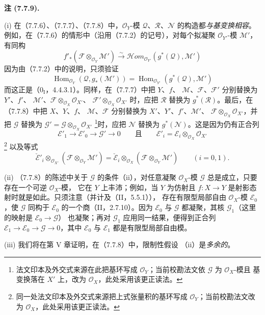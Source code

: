 \documentclass[UTF8,fontset=none,11pt,oneside,openany]{ctexbook}
\newcommand{\SourceCorrectionNote}[1]{\footnote{#1}}
\newenvironment{remarks}[1][]{%
  \par\medskip\noindent\textbf{注 (#1).}\ %
}{\par}
\newcommand{\oldpage}[2][]{%
  \hypertarget{ega-source-page-#1-#2}{}%
  \marginnote{\scriptsize\textbf{#1}~|~#2}\ignorespaces}
\begin{document}
\oldpage[III]{203}
\begin{remarks}[7.7.9]
\textnormal{(i)} 在（7.7.6）、（7.7.7）、（7.7.8）中，$\mathscr O_Y$-模
$\mathscr Q$、$\mathscr R$、$\mathscr N$ 的构造都\emph{与基变换相容}。
例如，在（7.7.6）的情形中（沿用（7.7.2）的记号），对每个拟凝聚
$\mathscr O_{Y'}$-模 $\mathscr M'$，有同构
\[
  f'_*(\mathscr F\otimes_{\mathscr O_Y}\mathscr M')
  \xrightarrow{\sim}
  \mathscr{H}\!om_{\mathscr O_{Y'}}(g^*(\mathscr Q),\mathscr M')
\]
因为由（7.7.2）中的说明，只须验证
\[
  \operatorname{Hom}_{\mathscr O_Y}(\mathscr Q,g_*(\mathscr M'))
  =
  \operatorname{Hom}_{\mathscr O_{Y'}}(g^*(\mathscr Q),\mathscr M')
\]
而这正是（$0_{\mathrm I}$，4.4.3.1）。同样，在（7.7.7）中把 $Y$、$f$、
$\mathscr M$、$\mathscr F$、$\mathscr F'$ 分别替换为 $Y'$、$f'$、
$\mathscr M'$、$\mathscr F\otimes_{\mathscr O_X}\mathscr O_{X'}$、
$\mathscr F'\otimes_{\mathscr O_X}\mathscr O_{X'}$ 时，应把 $\mathscr R$
替换为 $g^*(\mathscr R)$。最后，在（7.7.8）中把 $X$、$Y$、$f$、
$\mathscr M$、$\mathscr F$ 分别替换为 $X'$、$Y'$、$f'$、$\mathscr M'$、
$\mathscr F\otimes_{\mathscr O_X}\mathscr O_{X'}$，并把 $\mathscr G$ 替换为
$\mathscr G'=\mathscr G\otimes_{\mathscr O_X}\mathscr O_{X'}$
\SourceCorrectionNote{法文印本及外交式来源在此把基环写成
$\mathscr O_Y$；当前校勘法文依 $\mathscr G$ 为 $\mathscr O_X$-模且
基变换落在 $X'$ 上，改为 $\mathscr O_X$，此处采用该更正读法。}时，应把
$\mathscr N$ 替换为 $g^*(\mathscr N)$。这是因为仍有正合列
\[
  \mathscr E'_1\longrightarrow
  \mathscr E'_0\longrightarrow
  \mathscr G'\longrightarrow0
  \qquad\text{且}\qquad
  \mathscr E'_i=\mathscr E_i\otimes_{\mathscr O_X}\mathscr O_{X'}
\]
\SourceCorrectionNote{同一处法文印本及外交式来源把上式张量积的基环写成
$\mathscr O_Y$；当前校勘法文改为 $\mathscr O_X$，此处采用该更正读法。}
以及等式
\[
  \check{\mathscr E}'_i
  \otimes_{\mathscr O_{X'}}
  (\mathscr F\otimes_{\mathscr O_Y}\mathscr M')
  =
  \check{\mathscr E}_i
  \otimes_{\mathscr O_X}
  (\mathscr F\otimes_{\mathscr O_Y}\mathscr M')
  \qquad(i=0,1).
\]

\medskip
\textnormal{(ii)} （7.7.8）的陈述中关于 $\mathscr G$ 的条件（ii），对任意凝聚
$\mathscr O_X$-模 $\mathscr G$ 总是成立，只要存在一个可逆 $\mathscr O_X$-模，
它在 $Y$ 上丰沛；例如，当 $Y$ 为仿射且
$f:X\to Y$ 是射影态射时就是如此。只须注意（并计及（II，5.5.1）），
存在有限型局部自由 $\mathscr O_X$-模 $\mathscr E_0$，使 $\mathscr G$
同构于 $\mathscr E_0$ 的一个商（II，2.7.10）。因为 $\mathscr E_0$ 与
$\mathscr G$ 都凝聚，其核 $\mathscr G_1$（这里的映射是
$\mathscr E_0\to\mathscr G$）
也凝聚；再对 $\mathscr G_1$ 应用同一结果，便得到正合列
$\mathscr E_1\to\mathscr E_0\to\mathscr G\to0$，其中 $\mathscr E_0$ 与
$\mathscr E_1$ 都是有限型局部自由模。

\medskip
\textnormal{(iii)} 我们将在第 V 章证明，在（7.7.8）中，限制性假设
（ii）是\emph{多余的}。
\end{remarks}
\end{document}
